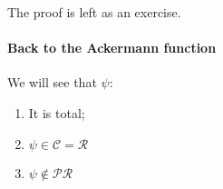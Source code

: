 The proof is left as an exercise.

\paragraph{\textbf{Back to the Ackermann function}}

We will see that $\psi$:
\begin{enumerate}
\item It is total;
\item $ \psi \in \mathcal{C} = \mathcal{R} $
\item $ \psi \not \in \mathcal{PR} $
\end{enumerate}





